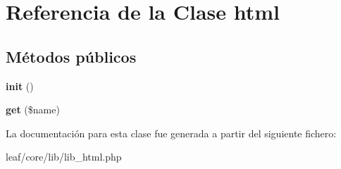 \hypertarget{classhtml}{\section{Referencia de la Clase html}
\label{classhtml}
}
\subsection*{Métodos públicos}
\begin{DoxyCompactItemize}
\item 
\hypertarget{classhtml_a4be4055f3361d4800e16bc2e2e38cda6}{{\bfseries init} ()}\label{classhtml_a4be4055f3361d4800e16bc2e2e38cda6}

\item 
\hypertarget{classhtml_af5ea6a083ddb07beb8a30dd32e309ceb}{{\bfseries get} (\$name)}\label{classhtml_af5ea6a083ddb07beb8a30dd32e309ceb}

\end{DoxyCompactItemize}


La documentación para esta clase fue generada a partir del siguiente fichero\-:\begin{DoxyCompactItemize}
\item 
leaf/core/lib/lib\-\_\-html.\-php\end{DoxyCompactItemize}
